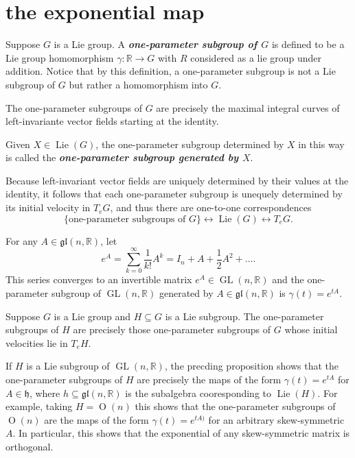 \section{the exponential map}
\begin{defn}
	Suppose $G$ is a Lie group. A \textbf{\textit{one-parameter subgroup of $G$}} is defined to be a Lie group homomorphism $\gamma:\mathbb{R}\to G$ with $R$ considered as a lie group under addition. Notice that by this definition, a one-parameter subgroup is not a Lie subgroup of $G$ but rather a homomorphism into $G$.
\end{defn}
\begin{thm}
	The one-parameter subgroups of $G$ are precisely the maximal integral curves of left-invariante vector fields starting at the identity.
\end{thm}
\begin{defn}
	Given $X\in\operatorname{Lie}(G)$, the one-parameter subgroup determined by $X$ in this way is called the \textbf{\textit{one-parameter subgroup generated by $X$}}.
\end{defn}
Because left-invariant vector fields are uniquely determined by their values at the identity, it follows that each one-parameter subgroup is unequely determined by its initial velocity in $T_eG$, and thus there are one-to-one correspondences
\[\{\text{one-parameter subgroups of }G\}\leftrightarrow\operatorname{Lie}(G)\leftrightarrow T_eG.\]
\begin{prop}
	For any $A\in\mathfrak{gl}(n,\mathbb{R})$, let
	\[e^A=\sum_{k=0}^\infty\frac{1}{k!}A^k=I_n+A+\frac{1}{2}A^2+\ldots.\]
	This series converges to an invertible matrix $e^A\in\operatorname{GL}(n,\mathbb{R})$ and the one-parameter subgroup of $\operatorname{GL}(n,\mathbb{R})$ generated by $A\in\mathfrak{gl}(n,\mathbb{R})$ is $\gamma(t)=e^{tA}$.
\end{prop}
\begin{prop}
	Suppose $G$ is a Lie group and $H\subseteq G$ is a Lie subgroup. The one-parameter subgroups of $H$ are precisely those one-parameter subgroups of $G$ whose initial velocities lie in $T_eH$.
\end{prop}
\begin{example}
	If $H$ is a Lie subgroup of $\operatorname{GL}(n,\mathbb{R})$, the precding proposition shows that the one-parameter subgroups of $H$ are precisely the maps of the form $\gamma(t)=e^{tA}$ for $A\in\mathfrak{h}$, where $h\subseteq\mathfrak{gl}(n,\mathbb{R})$ is the subalgebra cooresponding to $\operatorname{Lie}(H)$. For example, taking $H=\operatorname{O}(n)$ this shows that the one-parameter subgroups of $\operatorname{O}(n)$ are the maps of the form $\gamma(t)=e^{tA)}$ for an arbitrary skew-symmetric $A$. In particular, this shows that the exponential of any skew-symmetric matrix is orthogonal.
\end{example}
